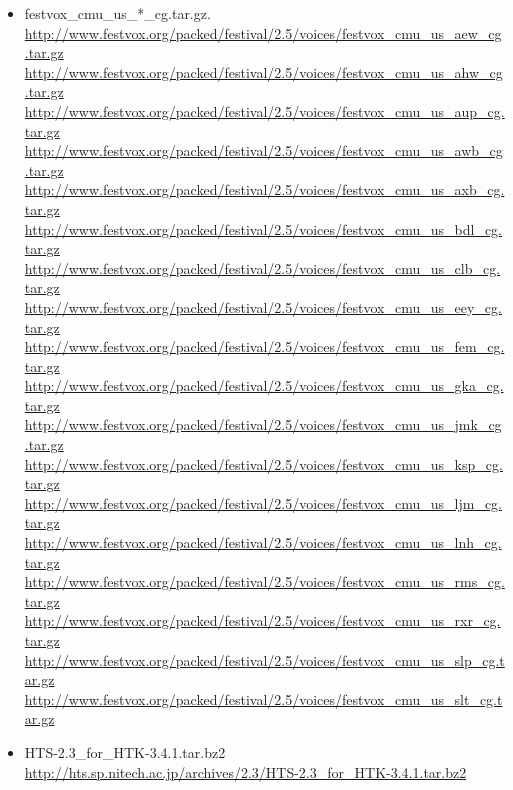 \documentclass[12pt,]{article}
\begin{document}
\begin{itemize}
		\item festvox\_cmu\_us\_*\_cg.tar.gz. \\
		\url{http://www.festvox.org/packed/festival/2.5/voices/festvox_cmu_us_aew_cg.tar.gz}\\
		\url{http://www.festvox.org/packed/festival/2.5/voices/festvox_cmu_us_ahw_cg.tar.gz}\\
		\url{http://www.festvox.org/packed/festival/2.5/voices/festvox_cmu_us_aup_cg.tar.gz}\\
		\url{http://www.festvox.org/packed/festival/2.5/voices/festvox_cmu_us_awb_cg.tar.gz}\\
		\url{http://www.festvox.org/packed/festival/2.5/voices/festvox_cmu_us_axb_cg.tar.gz}\\
		\url{http://www.festvox.org/packed/festival/2.5/voices/festvox_cmu_us_bdl_cg.tar.gz}\\
		\url{http://www.festvox.org/packed/festival/2.5/voices/festvox_cmu_us_clb_cg.tar.gz}\\
		\url{http://www.festvox.org/packed/festival/2.5/voices/festvox_cmu_us_eey_cg.tar.gz}\\
		\url{http://www.festvox.org/packed/festival/2.5/voices/festvox_cmu_us_fem_cg.tar.gz}\\
		\url{http://www.festvox.org/packed/festival/2.5/voices/festvox_cmu_us_gka_cg.tar.gz}\\
		\url{http://www.festvox.org/packed/festival/2.5/voices/festvox_cmu_us_jmk_cg.tar.gz}\\
		\url{http://www.festvox.org/packed/festival/2.5/voices/festvox_cmu_us_ksp_cg.tar.gz}\\
		\url{http://www.festvox.org/packed/festival/2.5/voices/festvox_cmu_us_ljm_cg.tar.gz}\\
		\url{http://www.festvox.org/packed/festival/2.5/voices/festvox_cmu_us_lnh_cg.tar.gz}\\
		\url{http://www.festvox.org/packed/festival/2.5/voices/festvox_cmu_us_rms_cg.tar.gz}\\
		\url{http://www.festvox.org/packed/festival/2.5/voices/festvox_cmu_us_rxr_cg.tar.gz}\\
		\url{http://www.festvox.org/packed/festival/2.5/voices/festvox_cmu_us_slp_cg.tar.gz}\\
		\url{http://www.festvox.org/packed/festival/2.5/voices/festvox_cmu_us_slt_cg.tar.gz}
		
		\item HTS-2.3\_for\_HTK-3.4.1.tar.bz2 \\
		\url{http://hts.sp.nitech.ac.jp/archives/2.3/HTS-2.3_for_HTK-3.4.1.tar.bz2}
		

\end{itemize}
\end{document}
